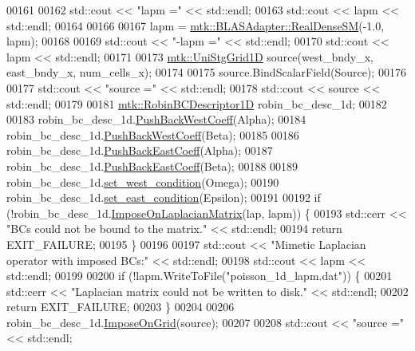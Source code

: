 \begin{DoxyCode}
00161 
00162   std::cout << \textcolor{stringliteral}{"lapm ="} << std::endl;
00163   std::cout << lapm << std::endl;
00164 
00166 
00167   lapm = \hyperlink{classmtk_1_1BLASAdapter_a0dd80d043615a95f11b7341ce69b44d3}{mtk::BLASAdapter::RealDenseSM}(-1.0, lapm);
00168 
00169   std::cout << \textcolor{stringliteral}{"-lapm ="} << std::endl;
00170   std::cout << lapm << std::endl;
00171 
00173   \hyperlink{classmtk_1_1UniStgGrid1D}{mtk::UniStgGrid1D} source(west\_bndy\_x, east\_bndy\_x, num\_cells\_x);
00174 
00175   source.BindScalarField(Source);
00176 
00177   std::cout << \textcolor{stringliteral}{"source ="} << std::endl;
00178   std::cout << source << std::endl;
00179 
00181   \hyperlink{classmtk_1_1RobinBCDescriptor1D}{mtk::RobinBCDescriptor1D} robin\_bc\_desc\_1d;
00182 
00183   robin\_bc\_desc\_1d.\hyperlink{classmtk_1_1RobinBCDescriptor1D_acdf8a75f8c39b3b8a032af81e0fd2e89}{PushBackWestCoeff}(Alpha);
00184   robin\_bc\_desc\_1d.\hyperlink{classmtk_1_1RobinBCDescriptor1D_acdf8a75f8c39b3b8a032af81e0fd2e89}{PushBackWestCoeff}(Beta);
00185 
00186   robin\_bc\_desc\_1d.\hyperlink{classmtk_1_1RobinBCDescriptor1D_a7791c11e0950656cb5608a77918c28d4}{PushBackEastCoeff}(Alpha);
00187   robin\_bc\_desc\_1d.\hyperlink{classmtk_1_1RobinBCDescriptor1D_a7791c11e0950656cb5608a77918c28d4}{PushBackEastCoeff}(Beta);
00188 
00189   robin\_bc\_desc\_1d.\hyperlink{classmtk_1_1RobinBCDescriptor1D_a06bfaf0126d528247c3c76fdd19f4b85}{set\_west\_condition}(Omega);
00190   robin\_bc\_desc\_1d.\hyperlink{classmtk_1_1RobinBCDescriptor1D_a4edc92eeaaaa3f1e7f2cedfea3d35681}{set\_east\_condition}(Epsilon);
00191 
00192   \textcolor{keywordflow}{if} (!robin\_bc\_desc\_1d.\hyperlink{classmtk_1_1RobinBCDescriptor1D_ab8446428df923c27f388a85bd3f2c6d4}{ImposeOnLaplacianMatrix}(lap, lapm)) \{
00193     std::cerr << \textcolor{stringliteral}{"BCs  could not be bound to the matrix."} << std::endl;
00194     \textcolor{keywordflow}{return} EXIT\_FAILURE;
00195   \}
00196 
00197   std::cout << \textcolor{stringliteral}{"Mimetic Laplacian operator with imposed BCs:"} << std::endl;
00198   std::cout << lapm << std::endl;
00199 
00200   \textcolor{keywordflow}{if} (!lapm.WriteToFile(\textcolor{stringliteral}{"poisson\_1d\_lapm.dat"})) \{
00201     std::cerr << \textcolor{stringliteral}{"Laplacian matrix could not be written to disk."} << std::endl;
00202     \textcolor{keywordflow}{return} EXIT\_FAILURE;
00203   \}
00204 
00206   robin\_bc\_desc\_1d.\hyperlink{classmtk_1_1RobinBCDescriptor1D_ab0daec1d6c5c9c6768bea08281a3831d}{ImposeOnGrid}(source);
00207 
00208   std::cout << \textcolor{stringliteral}{"source ="} << std::endl;

\end{DoxyCode}
